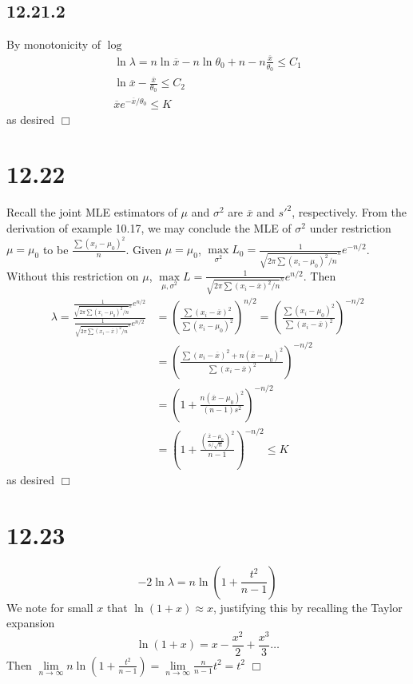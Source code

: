 \documentclass{article}
\begin{document}
\subsection*{12.21.2}
By monotonicity of $\log$
\begin{gather*}
\ln\lambda = n\ln \overline{x} - n\ln \theta_0 + n - n\frac{\overline{x}}{\theta_0} \leqslant C_1\\
\ln\overline{x} - \frac{\overline{x}}{\theta_0} \leqslant C_2\\
\overline{x}e^{-\overline{x}/\theta_0} \leqslant K
\end{gather*}
as desired $\Box$

\section*{12.22}
Recall the joint MLE estimators of $\mu$ and $\sigma^2$ are $\overline{x}$ and ${s'}^2$, respectively. From the derivation of example 10.17, we may conclude the MLE of $\sigma^2$ under restriction $\mu = \mu_0$ to be $\frac{\sum(x_i-\mu_0)^2}{n}$.
Given $\mu = \mu_0$, $\max\limits_{\sigma^2} L_0 = \frac{1}{\sqrt{2\pi\sum(x_i-\mu_0)^2/n}^n}e^{-n/2}$. Without this restriction on $\mu$, $\max\limits_{\mu,\sigma^2} L = \frac{1}{\sqrt{2\pi\sum(x_i-\overline{x})^2/n}^n}e^{n/2}$. Then
\begin{equation*}
\begin{split}
\lambda = \frac{\frac{1}{\sqrt{2\pi\sum(x_i-\mu_0)^2/n}^n}e^{n/2}}{\frac{1}{\sqrt{2\pi\sum(x_i-\overline{x})^2/n}^n}e^{n/2}} &= \left(\frac{\sum(x_i-\overline{x})^2}{\sum(x_i-\mu_0)^2}\right)^{n/2} = \left(\frac{\sum(x_i-\mu_0)^2}{\sum(x_i-\overline{x})^2}\right)^{-n/2}\\
&= \left(\frac{\sum(x_i-\overline{x})^2 + n(\overline{x}-\mu_0)^2}{\sum(x_i-\overline{x})^2}\right)^{-n/2}\\
&= \left(1 + \frac{n(\overline{x}-\mu_0)^2}{(n-1)s^2}\right)^{-n/2}\\
&= \left(1+ \frac{\left(\frac{\overline{x}-\mu_0}{s/\sqrt{n}}\right)^2}{n-1}\right)^{-n/2} \leqslant K
\end{split}
\end{equation*}
as desired $\Box$

\section*{12.23}
$$-2\ln\lambda = n\ln\left(1+\frac{t^2}{n-1}\right)$$
We note for small $x$ that $\ln(1+x) \approx x$, justifying this by recalling the Taylor expansion
$$\ln(1+x) = x - \frac{x^2}{2} + \frac{x^3}{3} \dots$$
Then $\lim\limits_{n\rightarrow \infty} n\ln\left(1+\frac{t^2}{n-1}\right) = \lim\limits_{n\rightarrow\infty} \frac{n}{n-1}t^2 = t^2$ $\Box$
\end{document}
